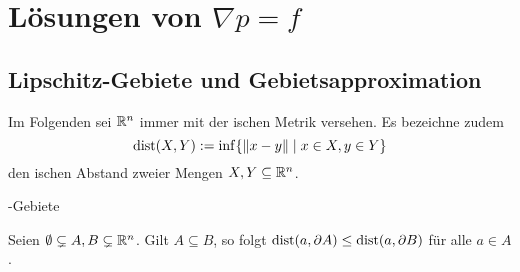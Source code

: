 \chapter{Lösungen von $\nabla p = f$}
\section{Lipschitz-Gebiete und Gebietsapproximation}

Im Folgenden sei $\mathbb{R}^n$ immer mit der \euklid ischen Metrik versehen. Es bezeichne zudem
$$
\operatorname{dist}(X,Y) := \inf\{ \lVert x - y \rVert \mid x \in X, y \in Y\}
$$
den \euklid ischen Abstand zweier Mengen $X,Y \subseteq \mathbb{R}^n$.

\begin{defn}
  \lipschitz\hyp{}Gebiete  
\end{defn}

\begin{lem}
  \label{lem:distBoundary}
  Seien $\emptyset \subsetneq A,B \subsetneq \mathbb{R}^n$. Gilt $A \subseteq B$, so folgt $\operatorname{dist}(a,\partial A) \leq \operatorname{dist}(a, \partial B)$ für alle $a \in A$.
\end{lem}

